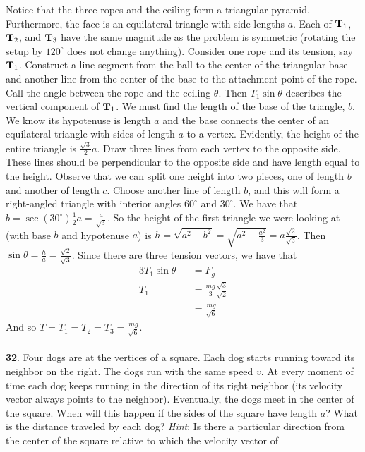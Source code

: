 \documentclass[12pt]{amsbook}
\begin{document}
Notice that the three ropes and the ceiling form a triangular pyramid. Furthermore, the face is an equilateral triangle with side lengths $a$. Each of ${\bf T}_1$, ${\bf T}_2$, and ${\bf T}_3$ have the same magnitude as the problem is symmetric (rotating the setup by $120^\circ$ does not change anything). Consider one rope and its tension, say ${\bf T}_1$. Construct a line segment from the ball to the center of the triangular base and another line from the center of the base to the attachment point of the rope. Call the angle between the rope and the ceiling   $\theta$. Then $T_1\sin\theta$ describes the vertical component of ${\bf T}_1$. We must find the length of the base of the triangle, $b$. We know its hypotenuse is length $a$ and the base connects the center of an equilateral triangle with sides of length $a$ to a vertex. Evidently, the height of the entire triangle is $\frac {\sqrt{3}}{2}a$. Draw three lines from each vertex to the opposite side. These lines should be perpendicular to the opposite side and have length equal to the height. Observe that we can split one height into two pieces, one of length $b$ and another of length $c$. Choose another line of length $b$, and this will form a right-angled triangle with interior angles $60^\circ$ and $30^\circ$. We have that $b=\sec(30^\circ)\frac 12a= \frac{a}{\sqrt{3}}$. So the height of the first triangle we were looking at (with base $b$ and hypotenuse $a$) is $h=\sqrt{a^2-b^2}=\sqrt{a^2-\frac{a^2}{3}}=a\frac{\sqrt{2}}{\sqrt{3}}$. Then $\sin\theta=\frac{h}{a}=\frac{\sqrt{2}}{\sqrt{3}}$. Since there are three tension vectors, we have that 
\begin{eqnarray*}
3T_1\sin\theta&&=F_g\\
T_1&&=\frac{mg}{3}\frac{\sqrt{3}}{\sqrt{2}}\\
&&=\frac{mg}{\sqrt{6}}
\end{eqnarray*}
And so $T=T_1=T_2=T_3=\frac{mg}{\sqrt{6}}$.
\\
\\
{\small\bf 32}. Four dogs are at the vertices of a square.
Each dog starts running toward its neighbor on the right.
The dogs run with the same speed $v$. At every moment 
of time each dog keeps running  
in the direction of its right neighbor (its velocity 
vector always points to the neighbor). Eventually, the 
dogs meet in the center of the square. When will this 
happen if the sides of the square have length $a$?
What is the distance
traveled by each dog? 
{\it Hint}:  Is there 
a particular direction from the center of the square relative to which the velocity vector of 
\end{document}
